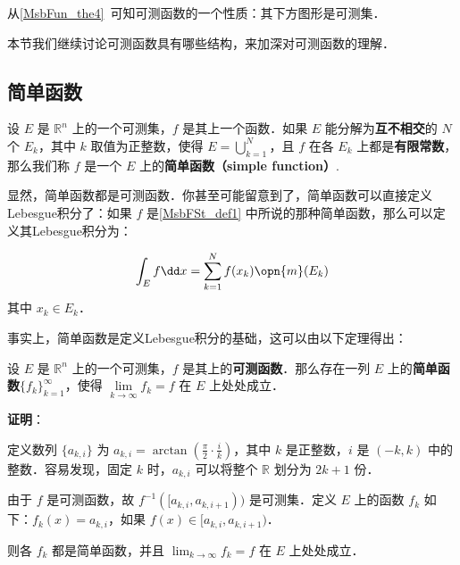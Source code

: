 

从\autoref{MsbFun_the4}~可知可测函数的一个性质：其下方图形是可测集．

本节我们继续讨论可测函数具有哪些结构，来加深对可测函数的理解．

\subsection{简单函数}

\begin{definition}{}\label{MsbFSt_def1}
设 $E$ 是 $\mathbb{R}^n$ 上的一个可测集，$f$ 是其上一个函数．如果 $E$ 能分解为\textbf{互不相交}的 $N$ 个 $E_k$，其中 $k$ 取值为正整数，使得 $E=\bigcup_{k=1}^N$，且 $f$ 在各 $E_k$ 上都是\textbf{有限常数}，那么我们称 $f$ 是一个 $E$ 上的\textbf{简单函数（simple function）}.
\end{definition}

显然，简单函数都是可测函数．你甚至可能留意到了，简单函数可以直接定义Lebesgue积分了：如果 $f$ 是\autoref{MsbFSt_def1} 中所说的那种简单函数，那么可以定义其Lebesgue积分为：

\begin{equation}\label{MsbFSt_eq1}
\int_E f \dd x = \sum_{k=1}^N f(x_k) \opn{m}(E_k)
\end{equation}
其中 $x_k\in E_k$．

事实上，简单函数是定义Lebesgue积分的基础，这可以由以下定理得出：

\begin{theorem}{}\label{MsbFSt_the1}
设 $E$ 是 $\mathbb{R}^n$ 上的一个可测集，$f$ 是其上的\textbf{可测函数}．那么存在一列 $E$ 上的\textbf{简单函数}$\{f_k\}_{k=1}^\infty$，使得 $\lim\limits_{k\to\infty}f_k=f$ 在 $E$ 上处处成立．
\end{theorem}

\textbf{证明}：

定义数列 $\{a_{k, i}\}$ 为 $a_{k, i}=\arctan(\frac{\pi}{2}\cdot\frac{i}{k})$，其中 $k$ 是正整数，$i$ 是 $(-k, k)$ 中的整数．容易发现，固定 $k$ 时，$a_{k, i}$ 可以将整个 $\mathbb{R}$ 划分为 $2k+1$ 份．

由于 $f$ 是可测函数，故 $f^{-1}([a_{k, i}, a_{k, i+1}))$ 是可测集．定义 $E$ 上的函数 $f_k$ 如下：$f_k(x)=a_{k, i}$，如果 $f(x)\in [a_{k, i}, a_{k, i+1})$．

则各 $f_k$ 都是简单函数，并且 $\lim_{k\to\infty}f_k=f$ 在 $E$ 上处处成立．

